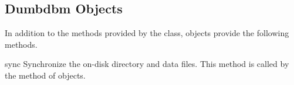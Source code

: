 \subsection{Dumbdbm Objects \label{dumbdbm-objects}}

In addition to the methods provided by the  class,
 objects provide the following methods.

\begin{methoddesc}{sync}{}
Synchronize the on-disk directory and data files.  This method is called by
the  method of  objects.
\end{methoddesc}
